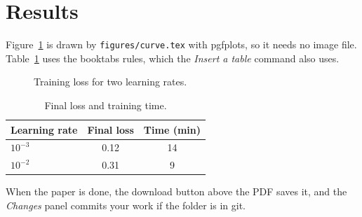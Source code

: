 \section{Results}
\label{sec:results}

Figure~\ref{fig:curve} is drawn by \texttt{figures/curve.tex} with pgfplots, so it needs no image file.
Table~\ref{tab:results} uses the booktabs rules, which the \emph{Insert a table} command also uses.

\begin{figure}[t]
  \centering
  
  \caption{Training loss for two learning rates.}
  \label{fig:curve}
\end{figure}

\begin{table}[t]
  \centering
  \caption{Final loss and training time.}
  \label{tab:results}
  \begin{tabular}{lcc}
    \toprule
    Learning rate & Final loss & Time (min) \\
    \midrule
    $10^{-3}$ & 0.12 & 14 \\
    $10^{-2}$ & 0.31 & 9 \\
    \bottomrule
  \end{tabular}
\end{table}

When the paper is done, the download button above the PDF saves it, and the \emph{Changes} panel commits your work
if the folder is in git.
